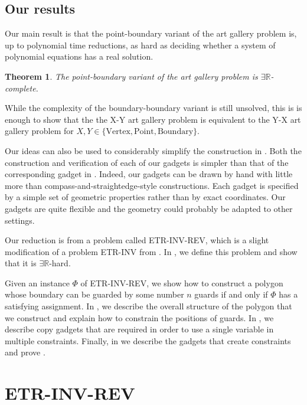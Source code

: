 \documentclass[11pt]{article}
\newcommand{\rr}{\mathbb R}
\theoremstyle{plain}
\newtheorem{theorem}{Theorem}
\theoremstyle{definition}
\numberwithin{theorem}{section}
\begin{document}
\subsection{Our results}

Our main result is that the point-boundary variant of the art gallery problem is, up to polynomial time reductions, as hard as deciding whether a system of polynomial equations has a real solution.

\begin{theorem}\label{BGMain}
The point-boundary variant of the art gallery problem is $\exists\rr$-complete.
\end{theorem}

While the complexity of the boundary-boundary variant is still unsolved, this is is enough to show that the the X-Y art gallery problem is equivalent to the Y-X art gallery problem for $X, Y\in \{\text{Vertex}, \text{Point}, \text{Boundary}\}$. 

Our ideas can also be used to considerably simplify the construction in \cite{ExistsRHardness}. Both the construction and verification of each of our gadgets is simpler than that of the corresponding gadget in \cite{ExistsRHardness}. Indeed, our gadgets can be drawn by hand with little more than compass-and-straightedge-style constructions. Each gadget is specified by a simple set of geometric properties rather than by exact coordinates. Our gadgets are quite flexible and the geometry could probably be adapted to other settings.

Our reduction is from a problem called ETR-INV-REV, which is a slight modification of a problem ETR-INV from \cite{ExistsRHardness}. In , we define this problem and show that it is $\exists\rr$-hard. 

Given an instance $\Phi$ of ETR-INV-REV, we show how to construct a polygon whose boundary can be guarded by some number $n$ guards if and only if $\Phi$ has a satisfying assignment. In , we describe the overall structure of the polygon that we construct and explain how to constrain the positions of guards. In , we describe copy gadgets that are required in order to use a single variable in multiple constraints. Finally, in  we describe the gadgets that create constraints and prove .

\section{ETR-INV-REV}\label{sec:ETR_INV_REV}
\end{document}
